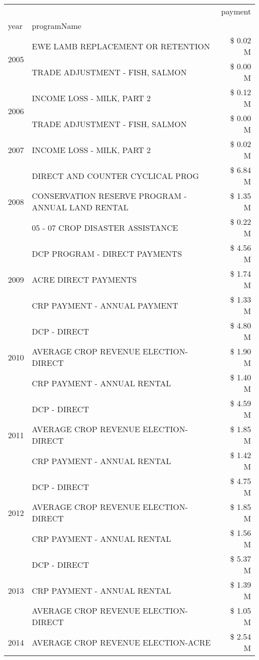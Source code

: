 \begin{tabular}{llr}
\toprule
 &  & payment \\
year & programName &  \\
\midrule
\multirow[t]{2}{*}{2005} & EWE LAMB REPLACEMENT OR RETENTION & \$ 0.02 M \\
 & TRADE ADJUSTMENT - FISH, SALMON & \$ 0.00 M \\
\cline{1-3}
\multirow[t]{2}{*}{2006} & INCOME LOSS - MILK, PART 2 & \$ 0.12 M \\
 & TRADE ADJUSTMENT - FISH, SALMON & \$ 0.00 M \\
\cline{1-3}
2007 & INCOME LOSS - MILK, PART 2 & \$ 0.02 M \\
\cline{1-3}
\multirow[t]{3}{*}{2008} & DIRECT AND COUNTER CYCLICAL PROG & \$ 6.84 M \\
 & CONSERVATION RESERVE PROGRAM - ANNUAL LAND RENTAL & \$ 1.35 M \\
 & 05 - 07 CROP DISASTER ASSISTANCE & \$ 0.22 M \\
\cline{1-3}
\multirow[t]{3}{*}{2009} & DCP PROGRAM - DIRECT PAYMENTS & \$ 4.56 M \\
 & ACRE DIRECT PAYMENTS & \$ 1.74 M \\
 & CRP PAYMENT - ANNUAL PAYMENT & \$ 1.33 M \\
\cline{1-3}
\multirow[t]{3}{*}{2010} & DCP - DIRECT & \$ 4.80 M \\
 & AVERAGE CROP REVENUE ELECTION-DIRECT & \$ 1.90 M \\
 & CRP PAYMENT - ANNUAL RENTAL & \$ 1.40 M \\
\cline{1-3}
\multirow[t]{3}{*}{2011} & DCP - DIRECT & \$ 4.59 M \\
 & AVERAGE CROP REVENUE ELECTION-DIRECT & \$ 1.85 M \\
 & CRP PAYMENT - ANNUAL RENTAL & \$ 1.42 M \\
\cline{1-3}
\multirow[t]{3}{*}{2012} & DCP - DIRECT & \$ 4.75 M \\
 & AVERAGE CROP REVENUE ELECTION-DIRECT & \$ 1.85 M \\
 & CRP PAYMENT - ANNUAL RENTAL & \$ 1.56 M \\
\cline{1-3}
\multirow[t]{3}{*}{2013} & DCP - DIRECT & \$ 5.37 M \\
 & CRP PAYMENT - ANNUAL RENTAL & \$ 1.39 M \\
 & AVERAGE CROP REVENUE ELECTION-DIRECT & \$ 1.05 M \\
\cline{1-3}
\multirow[t]{3}{*}{2014} & AVERAGE CROP REVENUE ELECTION-ACRE & \$ 2.54 M \\

\end{tabular}
